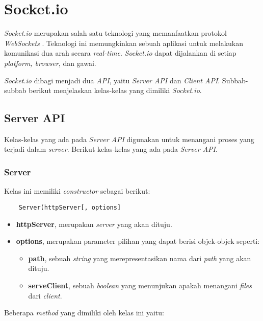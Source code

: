 
\section{Socket.io}
\label{sec:Socket.io}

\textit{Socket.io} merupakan salah satu teknologi yang memanfaatkan protokol \textit{WebSockets} \cite{socketio}. Teknologi ini memungkinkan sebuah aplikasi untuk melakukan komunikasi dua arah secara \textit{real-time}. \textit{Socket.io} dapat dijalankan di setiap \textit{platform, browser}, dan gawai.

\textit{Socket.io} dibagi menjadi dua \textit{API}, yaitu \textit{Server API} dan \textit{Client API}. Subbab-subbab berikut menjelaskan kelas-kelas yang dimiliki \textit{Socket.io}.

\subsection{Server API}
Kelas-kelas yang ada pada \textit{Server API} digunakan untuk menangani proses yang terjadi dalam \textit{server}\cite{socketioserver}. Berikut kelas-kelas yang ada pada \textit{Server API}.

\subsubsection{Server}
Kelas ini memiliki \textit{constructor} sebagai berikut:
\begin{lstlisting}
	Server(httpServer[, options]
\end{lstlisting}
 
	\begin{itemize}
		\item \textbf{httpServer}, merupakan \textit{server} yang akan dituju.
		\item \textbf{options}, merupakan parameter pilihan yang dapat berisi objek-objek seperti: 
			\begin{itemize}
				\item \textbf{path}, sebuah \textit{string} yang merepresentasikan nama dari \textit{path} yang akan dituju.
				\item \textbf{serveClient}, sebuah \textit{boolean} yang menunjukan apakah menangani \textit{files} dari \textit{client}.
			\end{itemize}
	\end{itemize}
	
Beberapa \textit{method} yang dimiliki oleh kelas ini yaitu: 

